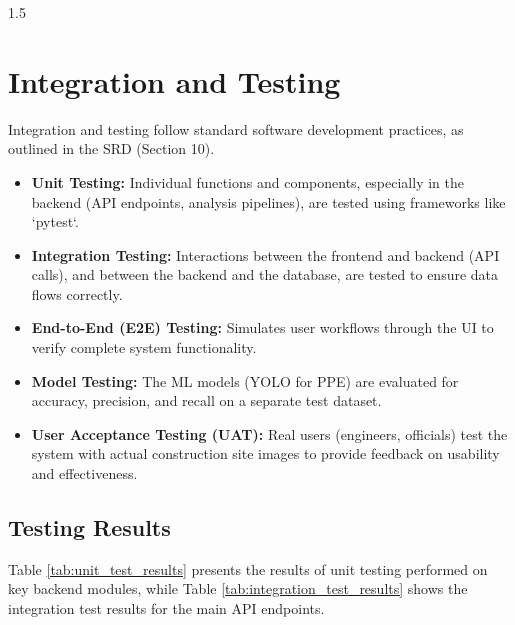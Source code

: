 \documentclass[12pt,a4paper]{report}
\begin{document}
\begin{spacing}{1.5}
    \section{Integration and Testing}
    Integration and testing follow standard software development practices, as outlined in the SRD \cite{SRD_IBCM} (Section 10).
    \begin{itemize}
        \item \textbf{Unit Testing:} Individual functions and components, especially in the backend (API endpoints, analysis pipelines), are tested using frameworks like `pytest`.
        \item \textbf{Integration Testing:} Interactions between the frontend and backend (API calls), and between the backend and the database, are tested to ensure data flows correctly.
        \item \textbf{End-to-End (E2E) Testing:} Simulates user workflows through the UI to verify complete system functionality.
        \item \textbf{Model Testing:} The ML models (YOLO for PPE) are evaluated for accuracy, precision, and recall on a separate test dataset.
        \item \textbf{User Acceptance Testing (UAT):} Real users (engineers, officials) test the system with actual construction site images to provide feedback on usability and effectiveness.
    \end{itemize}

    \subsection{Testing Results}
    Table \ref{tab:unit_test_results} presents the results of unit testing performed on key backend modules, while Table \ref{tab:integration_test_results} shows the integration test results for the main API endpoints.


\end{spacing}
\end{document}
